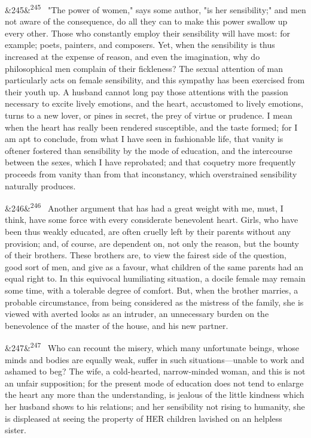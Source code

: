 \documentclass[12pt]{article}
\newcommand{\para}[1][]{\par\noindent\ifx&#1&\else\textsuperscript{\footnotesize #1}~\fi}
\begin{document}
\para[245] "The power of women," says some author, "is her sensibility;" and men not aware of the consequence, do all they can to make this power swallow up every other. Those who constantly employ their sensibility will have most: for example; poets, painters, and composers. Yet, when the sensibility is thus increased at the expense of reason, and even the imagination, why do philosophical men complain of their fickleness? The sexual attention of man particularly acts on female sensibility, and this sympathy has been exercised from their youth up. A husband cannot long pay those attentions with the passion necessary to excite lively emotions, and the heart, accustomed to lively emotions, turns to a new lover, or pines in secret, the prey of virtue or prudence. I mean when the heart has really been rendered susceptible, and the taste formed; for I am apt to conclude, from what I have seen in fashionable life, that vanity is oftener fostered than sensibility by the mode of education, and the intercourse between the sexes, which I have reprobated; and that coquetry more frequently proceeds from vanity than from that inconstancy, which overstrained sensibility naturally produces.

\para[246] Another argument that has had a great weight with me, must, I think, have some force with every considerate benevolent heart. Girls, who have been thus weakly educated, are often cruelly left by their parents without any provision; and, of course, are dependent on, not only the reason, but the bounty of their brothers. These brothers are, to view the fairest side of the question, good sort of men, and give as a favour, what children of the same parents had an equal right to. In this equivocal humiliating situation, a docile female may remain some time, with a tolerable degree of comfort. But, when the brother marries, a probable circumstance, from being considered as the mistress of the family, she is viewed with averted looks as an intruder, an unnecessary burden on the benevolence of the master of the house, and his new partner.

\para[247] Who can recount the misery, which many unfortunate beings, whose minds and bodies are equally weak, suffer in such situations---unable to work and ashamed to beg? The wife, a cold-hearted, narrow-minded woman, and this is not an unfair supposition; for the present mode of education does not tend to enlarge the heart any more than the understanding, is jealous of the little kindness which her husband shows to his relations; and her sensibility not rising to humanity, she is displeased at seeing the property of HER children lavished on an helpless sister.
\end{document}
